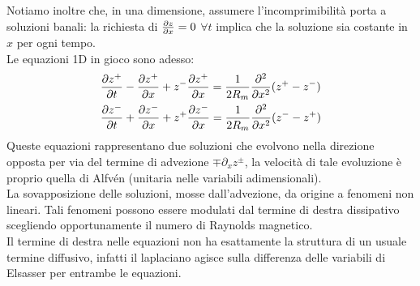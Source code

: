 Notiamo inoltre che, in una dimensione,  assumere l'incomprimibilità porta a soluzioni banali: la richiesta di $\frac{\partial z}{\partial x} = 0$ $\forall t$ implica che la soluzione sia costante in $x$ per ogni tempo.\\
Le equazioni 1D in gioco sono adesso:
\begin{align}
    &\frac{\partial z^+}{\partial t} - \frac{\partial z^+}{\partial x} + z^- \frac{\partial z^+}{\partial x} = \frac{1}{2R_m} \frac{\partial^2}{\partial x^2}(z^+ - z^-) \label{eq:Elsa1}\\
    &\frac{\partial z^-}{\partial t} + \frac{\partial z^-}{\partial x} + z^+ \frac{\partial z^-}{\partial x} = \frac{1}{2R_m} \frac{\partial^2}{\partial x^2}(z^- - z^+) \label{eq:Elsa2}
\end{align}
Queste equazioni rappresentano due soluzioni che evolvono nella direzione opposta per via del termine di advezione $\mp \partial_x z^{\pm}$, la velocità di tale evoluzione è proprio quella di Alfvén (unitaria nelle variabili adimensionali).\\
La sovapposizione delle soluzioni, mosse dall'advezione, da origine a fenomeni non lineari. Tali fenomeni possono essere modulati dal termine di destra dissipativo scegliendo opportunamente il numero di Raynolds magnetico. \\
Il termine di destra nelle equazioni non ha esattamente la struttura di un usuale termine diffusivo, infatti il laplaciano agisce sulla differenza delle variabili di Elsasser per entrambe le equazioni. 
